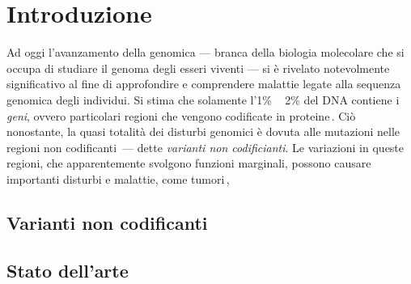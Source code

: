 \chapter{Introduzione}\label{chp:introduction}

Ad oggi l'avanzamento della genomica — branca della biologia molecolare che si occupa di studiare il genoma degli esseri viventi — si è rivelato notevolmente significativo al fine di approfondire e comprendere malattie legate alla sequenza genomica degli individui. Si stima che solamente l'1\% ~ 2\% del \ac{DNA} contiene i \textsl{geni}, ovvero particolari regioni che vengono codificate in proteine\,\cite{sahu2011identification}. Ciò nonostante, la quasi totalità dei disturbi genomici è dovuta alle mutazioni nelle regioni non codificanti\,\cite{zhang2015non} — dette \textsl{varianti non codificianti}. Le variazioni in queste regioni, che apparentemente svolgono funzioni marginali, possono causare importanti disturbi e malattie, come tumori\,\cite{khurana2016role}, 




\section{Varianti non codificanti}





\section{Stato dell'arte}




